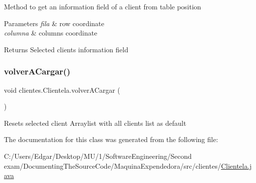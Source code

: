 Method to get an information field of a client from table position 
\begin{DoxyParams}{Parameters}
{\em fila} & row coordinate \\
\hline
{\em columna} & columns coordinate \\
\hline
\end{DoxyParams}
\begin{DoxyReturn}{Returns}
Selected client\textquotesingle{}s information field 
\end{DoxyReturn}
\mbox{\label{classclientes_1_1_clientela_a99c3c767c734c205696aaf32131e0119}} 
\subsubsection{\texorpdfstring{volver\+A\+Cargar()}{volverACargar()}}
{\footnotesize\ttfamily void clientes.\+Clientela.\+volver\+A\+Cargar (\begin{DoxyParamCaption}{ }\end{DoxyParamCaption})\hspace{0.3cm}{\ttfamily [inline]}}

Resets selected client Arraylist with all clients list as default 

The documentation for this class was generated from the following file\+:\begin{DoxyCompactItemize}
\item 
C\+:/\+Users/\+Edgar/\+Desktop/\+M\+U/1/\+Software\+Engineering/\+Second exam/\+Documenting\+The\+Source\+Code/\+Maquina\+Expendedora/src/clientes/\mbox{\hyperlink{_clientela_8java}{Clientela.\+java}}\end{DoxyCompactItemize}
